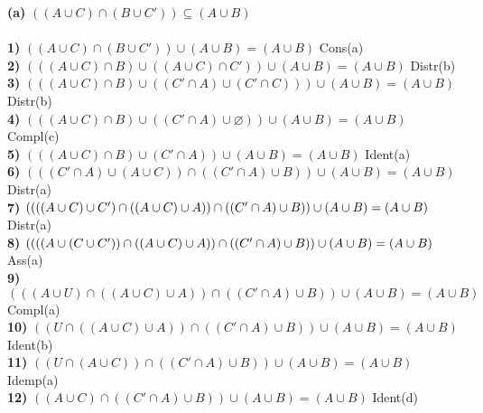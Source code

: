 \documentclass{article}
\begin{document}
\textbf{(a)} $((A \cup C) \cap (B \cup C')) \subseteq (A \cup B)$ \\~\\
\textbf{1)} $((A \cup C) \cap (B \cup C')) \cup (A \cup B) =  (A \cup B)$  	\hspace*{\fill} Cons(a) \\ 
\textbf{2)} $(((A \cup C) \cap B) \cup ((A \cup C) \cap C')) \cup (A \cup B)= (A \cup B)$ \hspace*{\fill} Distr(b) \\
\textbf{3)} $(((A \cup C) \cap B) \cup ((C' \cap A) \cup (C'\cap C))) \cup (A \cup B) = (A \cup B)$\hspace*{\fill} Distr(b) \\
\textbf{4)} $(((A \cup C) \cap B) \cup ((C' \cap A) \cup \varnothing)) \cup (A \cup B) = (A \cup B)$\hspace*{\fill} Compl(c)\\
\textbf{5)} $(((A \cup C) \cap B) \cup (C' \cap A)) \cup (A \cup B) = (A \cup B)$\hspace*{\fill} Ident(a)\\
\textbf{6)} $(((C' \cap A) \cup (A \cup C)) \cap ((C' \cap A) \cup B)) \cup (A \cup B) = (A \cup B) $\hspace*{\fill} Distr(a) \\
\textbf{7)} $((((A\cup C) \cup C') \cap ((A \cup C) \cup A)) \cap ((C' \cap A) \cup B)) \\ \cup (A \cup B) = (A \cup B) $\hspace*{\fill} Distr(a) \\
\textbf{8)} $((((A\cup (C \cup C')) \cap ((A \cup C) \cup A)) \cap ((C' \cap A) \cup B)) \\ \cup (A \cup B) = (A \cup B)$\hspace*{\fill} Ass(a) \\
\textbf{9)} $(((A\cup U) \cap ((A \cup C) \cup A)) \cap ((C' \cap A) \cup B)) \cup (A \cup B) = (A \cup B)$\hspace*{\fill} Compl(a) \\
\textbf{10)} $((U \cap ((A \cup C) \cup A)) \cap ((C' \cap A) \cup B)) \cup (A \cup B) = (A \cup B)$\hspace*{\fill} Ident(b)\\
\textbf{11)} $((U \cap (A \cup C)) \cap ((C' \cap A) \cup B)) \cup (A \cup B) = (A \cup B)$\hspace*{\fill} Idemp(a)\\
\textbf{12)} $((A \cup C) \cap ((C' \cap A) \cup B)) \cup (A \cup B) = (A \cup B)$\hspace*{\fill} Ident(d)\\
\end{document}
